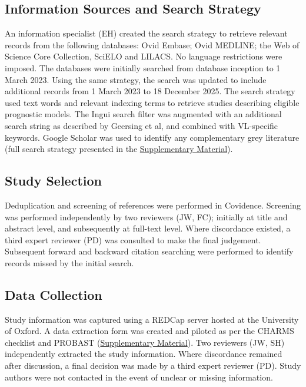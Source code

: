 \subsection{Information Sources and Search Strategy}

An information specialist (EH) created the search strategy to retrieve relevant records from the following databases: Ovid Embase; Ovid MEDLINE; the Web of Science Core Collection, SciELO and LILACS. No language restrictions were imposed. The databases were initially searched from database inception to 1 March 2023. Using the same strategy, the search was updated to include additional records from 1 March 2023 to 18 December 2025. The search strategy used text words and relevant indexing terms to retrieve studies describing eligible prognostic models. The Ingui search filter was augmented with an additional search string as described by Geersing et al\cite{inguiSearchingClinicalPrediction2001,geersingSearchFiltersFinding2012}, and combined with VL-specific keywords. Google Scholar was used to identify any complementary grey literature (full search strategy presented in the \href{https://github.com/jpwil/dphil}{Supplementary Material}).

\subsection{Study Selection}

Deduplication and screening of references were performed in Covidence\cite{covidence}. Screening was performed independently by two reviewers (JW, FC); initially at title and abstract level, and subsequently at full-text level. Where discordance existed, a third expert reviewer (PD) was consulted to make the final judgement. Subsequent forward and backward citation searching were performed to identify records missed by the initial search.

\subsection{Data Collection}

Study information was captured using a REDCap server hosted at the University of Oxford\cite{harrisREDCapConsortiumBuilding2019}. A data extraction form was created and piloted as per the CHARMS checklist and PROBAST (\href{https://github.com/jpwil/dphil}{Supplementary Material})\cite{moons2019,moonsCriticalAppraisalData2014,wolffPROBASTToolAssess2019}. Two reviewers (JW, SH) independently extracted the study information. Where discordance remained after discussion, a final decision was made by a third expert reviewer (PD). Study authors were not contacted in the event of unclear or missing information.

